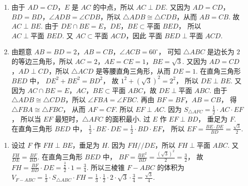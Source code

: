 \begin{solution}
\begin{enumerate}
\item 由于 \(AD=CD\)，\(E\) 是 \(AC\) 的中点，所以
\(AC\perp DE\).
又因为 \(AD=CD\)，\(BD=BD\)，\(\angle ADB=\angle CDB\)，所以 \(\triangle ADB\cong\triangle CDB\)，从而 \(AB=CB\).
故
\(AC\perp BE\).
由于
\(DE\cap BE=E\)，\(DE\)，\(BE\subset \text{平面 }BED\)，
所以
\(AC\perp \text{平面 }BED\).
又 \(AC\subset \text{平面 }ACD\)，因此
\(\text{平面 }BED\perp \text{平面 }ACD\).

\item 由题意
\(AB=BD=2\)，\(AB=CB\)，\(\angle ACB=60^\circ\)，
可知 \(\triangle ABC\) 是边长为 \(2\) 的等边三角形，所以
\(AC=2\)，\(AE=CE=1\)，\(BE=\sqrt3\).
又因为 \(AD=CD\)，\(AD\perp CD\)，所以 \(\triangle ACD\) 是等腰直角三角形，从而
\(DE=1\).
在直角三角形 \(BED\) 中，
\(DE^2+BE^2=BD^2\)，
故
\(1^2+(\sqrt3)^2=2^2\)，
所以
\(DE\perp BE\).
又因为 \(AC\cap BE=E\)，\(AC\)，\(BE\subset \text{平面 }ABC\)，故
\(DE\perp \text{平面 }ABC\).
由于 \(\triangle ADB\cong\triangle CDB\)，所以
\(\angle FBA=\angle FBC\).
再由
\(BF=BF\)，\(AB=CB\)，
得
\(\triangle FBA\cong\triangle FBC\)，
从而
\(AF=CF\).
所以
\(EF\perp AC\).
因为
\(S_{\triangle AFC}=\frac12\cdot AC\cdot EF\)，
所以当 \(EF\) 最短时，\(\triangle AFC\) 的面积最小.
过 \(E\) 作
\(EF\perp BD\)，
垂足为 \(F\). 在直角三角形 \(BED\) 中，
\(\frac12\cdot BE\cdot DE=\frac12\cdot BD\cdot EF\)，
所以
\(EF=\frac{BE\cdot DE}{BD}=\frac{\sqrt3}{2}\).

\end{enumerate}


\begin{enumerate}
\item[]

设过 \(F\) 作 \(FH\perp BE\)，垂足为 \(H\). 因为 \(FH//DE\)，所以
\(FH\perp \text{平面 }ABC\).
又
\(\frac{FH}{DE}=\frac{BF}{BD}\).
在直角三角形 \(BED\) 中，
\(BF=\frac{BE^2}{BD}=\frac{(\sqrt3)^2}{2}=\frac32\)，
故
\(FH=\frac{BF}{BD}\cdot DE=\frac{\frac{3}{2}}{2}\cdot1=\frac34\).
所以三棱锥 \(F-ABC\) 的体积为 \(V_{F-ABC}=\frac13\cdot S_{\triangle ABC}\cdot FH=\frac13\cdot\frac12\cdot2\cdot\sqrt3\cdot\frac34=\frac{\sqrt3}{4}\).
\end{enumerate}
\end{solution}

